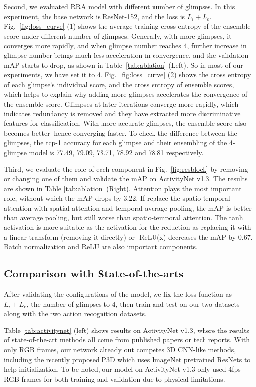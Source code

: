 \documentclass[runningheads]{llncs}
\begin{document}
Second, we evaluated RRA model with different number of glimpses. In this experiment, the base network is ResNet-152, and the loss is $L_i+L_e$.
Fig.~\ref{fig:loss_curve} (1) shows the average training cross entropy of the ensemble score under different number of glimpses. Generally, with more glimpses, it converges more rapidly, and when glimpse number reaches 4, further increase in glimpse number brings much less acceleration in convergence, and the validation mAP starts to drop, as shown in Table~\ref{tab:ablation} (Left). So in most of our experiments, we have set it to 4. Fig.~\ref{fig:loss_curve} (2) shows the cross entropy of each glimpse's individual score, and the cross entropy of ensemble scores, which helps to explain why adding more glimpses accelerates the convergence of the ensemble score. Glimpses at later iterations converge more rapidly,  which indicates redundancy is removed and they have extracted more discriminative features for classification. With more accurate glimpses, the ensemble score also becomes better, hence converging faster. To check the difference between the glimpses, the top-1 accuracy for each glimpse and their ensembling of the 4-glimpse model is 77.49, 79.09, 78.71, 78.92 and 78.81 respectively. 

Third, we evaluate the role of each component in Fig.~\ref{fig:resblock} by removing or changing one of them and validate the mAP on ActivityNet v1.3. The results are shown in Table \ref{tab:ablation} (Right). Attention plays the most important role, without which the mAP drops by 3.22. If replace the spatio-temporal attention with spatial attention and temporal average pooling, the mAP is better than average pooling, but still worse than spatio-temporal attention. The tanh activation is more suitable as the activation for the reduction as replacing it with a linear transform (removing it directly) or -ReLU(x) decreases the mAP by 0.67. Batch normalization and ReLU are also important components.

\subsection{Comparison with State-of-the-arts}




After validating the configurations of the model, we fix the loss function as $L_i+L_e$, the number of glimpses to 4, then train and test on our two datasets along with the two action recognition datasets.

Table \ref{tab:activitynet} (left) shows results on ActivityNet v1.3, where the results of state-of-the-art methods all come from published papers or tech reports. With only RGB frames, our network already out competes 3D CNN-like methods, including the recently proposed P3D \cite{qiu2017learning} which uses ImageNet pretrained ResNets to help initialization. To be noted, our model on ActivityNet v1.3 only used 4fps RGB frames for both training and validation due to physical limitations.
\end{document}
